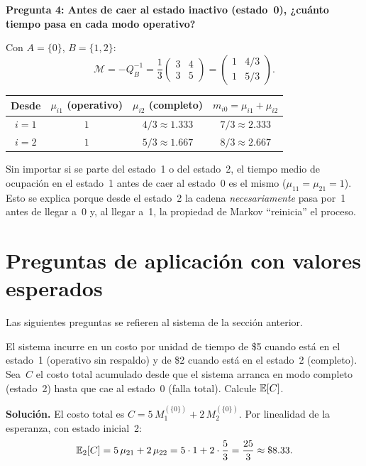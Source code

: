\documentclass[11pt, letterpaper]{article}
\begin{document}
\medskip
\textbf{Pregunta 4: Antes de caer al estado inactivo (estado~0),
¿cuánto tiempo pasa en cada modo operativo?}

Con $A=\{0\}$, $B=\{1,2\}$:
\[
  \mathcal{M} = -Q_B^{-1}
  = \frac{1}{3}\begin{pmatrix} 3 & 4 \\ 3 & 5 \end{pmatrix}
  = \begin{pmatrix} 1 & 4/3 \\ 1 & 5/3 \end{pmatrix}.
\]

\begin{resultadobox}
\begin{center}
\renewcommand{\arraystretch}{1.4}
\begin{tabular}{c|cc|c}
  \toprule
  \textbf{Desde} & $\mu_{i1}$ (operativo) & $\mu_{i2}$ (completo)
  & $m_{i0}=\mu_{i1}+\mu_{i2}$\\
  \midrule
  $i=1$ & $1$ & $4/3\approx 1.333$ & $7/3\approx 2.333$\\
  $i=2$ & $1$ & $5/3\approx 1.667$ & $8/3\approx 2.667$\\
  \bottomrule
\end{tabular}
\end{center}
\end{resultadobox}

\begin{notabox}
  Sin importar si se parte del estado~1 o del estado~2, el tiempo
  medio de ocupación en el estado~1 antes de caer al estado~0 es el
  mismo ($\mu_{11}=\mu_{21}=1$).  Esto se explica porque desde el
  estado~2 la cadena \emph{necesariamente} pasa por~1 antes de llegar
  a~0 y, al llegar a~1, la propiedad de Markov ``reinicia'' el proceso.
\end{notabox}

\section{Preguntas de aplicación con valores esperados}

Las siguientes preguntas se refieren al sistema de la sección anterior.

\begin{ejemplobox}
  El sistema incurre en un costo por unidad de tiempo de \$5 cuando
  está en el estado~1 (operativo sin respaldo) y de \$2 cuando está
  en el estado~2 (completo).  Sea~$C$ el costo total acumulado desde
  que el sistema arranca en modo completo (estado~2) hasta que cae al
  estado~0 (falla total).  Calcule $\mathbb{E}[C]$.

  \medskip
  \textbf{Solución.}  El costo total es
  $C = 5\,M_1^{(\{0\})} + 2\,M_2^{(\{0\})}$.
  Por linealidad de la esperanza, con estado inicial~2:
  \[
    \mathbb{E}_2[C] = 5\,\mu_{21} + 2\,\mu_{22}
    = 5\cdot 1 + 2\cdot\frac{5}{3}
    = \frac{25}{3} \approx \$8.33.
  \]
\end{ejemplobox}
\end{document}
